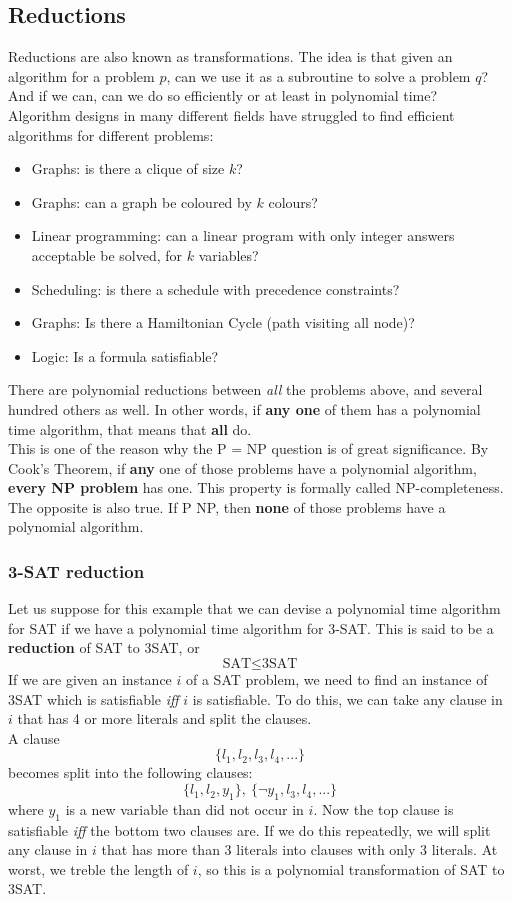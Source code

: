 \documentclass{article}
\theoremstyle{definition}
\newcommand{\n}[0]{\\[\baselineskip]}
\begin{document}
\subsection{Reductions}
Reductions are also known as transformations. The idea is that given an algorithm for a problem $p$, can we use it as a subroutine to solve a problem $q$? And if we can, can we do so efficiently or at least in polynomial time?
\n
Algorithm designs in many different fields have struggled to find efficient algorithms for different problems:
\begin{itemize}
\item Graphs: is there a clique of size $k$?
\item Graphs: can a graph be coloured by $k$ colours?
\item Linear programming: can a linear program with only integer answers acceptable be solved, for $k$ variables?
\item Scheduling: is there a schedule with precedence constraints?
\item Graphs: Is there a Hamiltonian Cycle (path visiting all node)?
\item Logic: Is a formula satisfiable?
\end{itemize}
There are polynomial reductions between \textit{all} the problems above, and several hundred others as well. In other words, if \textbf{any one} of them has a polynomial time algorithm, that means that \textbf{all} do. 
\n
This is one of the reason why the P = NP question is of great significance. By Cook's Theorem, if \textbf{any} one of those problems have a polynomial algorithm, \textbf{every NP problem} has one. This property is formally called NP-completeness. The opposite is also true. If P \neq NP, then \textbf{none} of those problems have a polynomial algorithm. 
\subsubsection{3-SAT reduction}
Let us suppose for this example that we can devise a polynomial time algorithm for SAT if we have a polynomial time algorithm for 3-SAT. This is said to be a \textbf{reduction} of SAT to 3SAT, or 
\begin{equation}
\text{SAT} \leq \text{3SAT}
\end{equation}
If we are given an instance $i$ of a SAT problem, we need to find an instance of 3SAT which is satisfiable \textit{iff} $i$ is satisfiable. To do this, we can take any clause in $i$ that has 4 or more literals and split the clauses.
\n
A clause 
\begin{equation}
\{l_{1}, l_{2}, l_{3}, l_{4}, ...\}
\end{equation}
becomes split into the following clauses:
\begin{equation}
\{l_{1}, l_{2}, y_{1}\},\ \{\neg y_{1}, l_{3}, l_{4}, ... \}
\end{equation}
where $y_{1}$ is a new variable than did not occur in $i$. Now the top clause is satisfiable \textit{iff} the bottom two clauses are. If we do this repeatedly, we will split any clause in $i$ that has more than 3 literals into clauses with only 3 literals. At worst, we treble the length of $i$, so this is a polynomial transformation of SAT to 3SAT.
\end{document}
